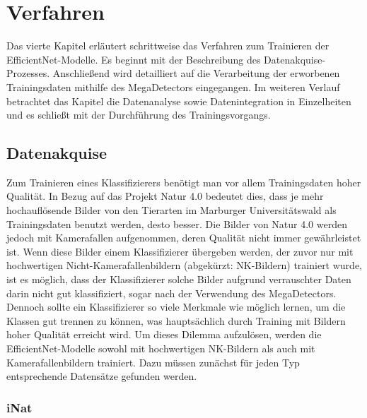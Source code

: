 \chapter{Verfahren} \label{chap:training}

Das vierte Kapitel erläutert schrittweise das Verfahren zum Trainieren der EfficientNet-Modelle. Es beginnt mit der Beschreibung des Datenakquise-Prozesses. Anschließend wird detailliert auf die Verarbeitung der erworbenen Trainingsdaten mithilfe des MegaDetectors eingegangen. Im weiteren Verlauf betrachtet das Kapitel die Datenanalyse sowie Datenintegration in Einzelheiten und es schließt mit der Durchführung des Trainingsvorgangs.

\section{Datenakquise}

Zum Trainieren eines Klassifizierers benötigt man vor allem Trainingsdaten hoher Qualität. In Bezug auf das Projekt Natur 4.0 bedeutet dies, dass je mehr hochauflösende Bilder von den Tierarten im Marburger Universitätswald als Trainingsdaten benutzt werden, desto besser. Die Bilder von Natur 4.0 werden jedoch mit Kamerafallen aufgenommen, deren Qualität nicht immer gewährleistet ist. Wenn diese Bilder einem Klassifizierer übergeben werden, der zuvor nur mit hochwertigen Nicht-Kamerafallenbildern (abgekürzt: NK-Bildern) trainiert wurde, ist es möglich, dass der Klassifizierer solche Bilder aufgrund verrauschter Daten darin nicht gut klassifiziert, sogar nach der Verwendung des MegaDetectors. Dennoch sollte ein Klassifizierer so viele Merkmale wie möglich lernen, um die Klassen gut trennen zu können, was hauptsächlich durch Training mit Bildern hoher Qualität erreicht wird. Um dieses Dilemma aufzulösen, werden die EfficientNet-Modelle sowohl mit hochwertigen NK-Bildern als auch mit Kamerafallenbildern trainiert. Dazu müssen zunächst für jeden Typ entsprechende Datensätze gefunden werden.

\subsection{iNat}


